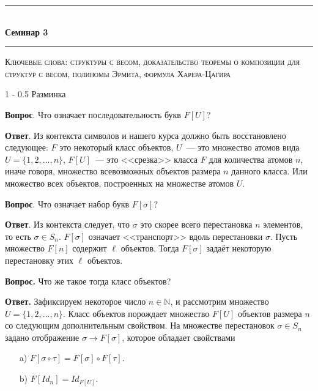 \documentclass[a5paper]{article}
\makeatletter
\def \topic {Семинар 3}
\theoremstyle{definition}
\renewcommand{\section}{\@startsection
{section}%
{1}%
{\z@}%
{-\baselineskip}%
{0.5\baselineskip}%
{\centering\large\scshape}} %
\makeatother
\begin{document}
\begin{center}

\newcommand{\HRule}{\rule{\linewidth}{0.5mm}}
\HRule \\[0.2cm]
{ \Large \bfseries \topic} %
\HRule

\end{center}

\textsc{Ключевые слова: 
структуры с весом, доказательство теоремы о композиции для структур с весом,
полиномы Эрмита, формула Харера-Цагира
}

\section{Разминка}

\textbf{Вопрос}. Что означает последовательность букв \( F[U] \)?

\textbf{Ответ}. Из контекста символов и нашего курса должно быть
восстановлено следующее: \( F \) это некоторый класс объектов, \( U \)~--- это
множество атомов вида \( U = \{ 1, 2, \ldots, n \} \), \( F[U] \)~--- это
<<срезка>> класса \( F \) для количества атомов \( n \), иначе говоря, множество
всевозможных объектов размера \( n \) данного класса. Или множество всех
объектов, построенных на множестве атомов \( U \).

\textbf{Вопрос}. Что означает набор букв \( F[\sigma] \)?

\textbf{Ответ}. Из контекста следует, что \( \sigma \) это скорее всего
перестановка \( n \) элементов, то есть \( \sigma \in S_n \). \( F[\sigma]\)
означает <<транспорт>> вдоль перестановки \( \sigma \). Пусть множество \( F[n]
\) содержит \( \ell \) объектов. Тогда \( F[\sigma] \) задаёт некоторую
перестановку этих \( \ell \) объектов.

\textbf{Вопрос.} Что же такое тогда класс объектов?

\textbf{Ответ.} Зафиксируем некоторое число \( n \in \mathbb N \), и рассмотрим
множество \( U = \{ 1, 2, \ldots, n \} \). Класс объектов порождает множество \(
F[U] \) объектов размера \( n \) со следующим дополнительным свойством. На
множестве перестановок \( \sigma \in
S_n \) задано отображение \( \sigma \to F[\sigma] \), которое обладает
свойствами
\begin{enumerate}
 \item[a)] \( F[\sigma \circ \tau] = F[\sigma]\circ F[\tau] \).
 \item[b)] \( F[Id_n] = Id_{F[U]} \). 
\end{enumerate}
\end{document}
